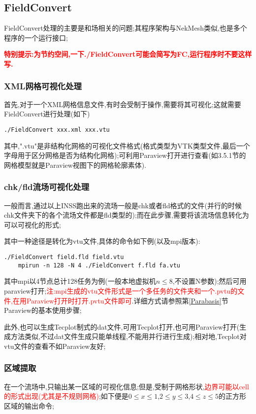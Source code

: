 \subsection{FieldConvert} \label{FieldConvert}
FieldConvert处理的主要是和场相关的问题;其程序架构与NekMesh类似,也是多个程序的一个运行接口;\par
\textcolor{red}{\textbf{特别提示:为节约空间,一下./FieldConvert可能会简写为FC,运行程序时不要这样写.}}

\subsubsection{XML网格可视化处理}
首先,对于一个XML网格信息文件,有时会受制于操作,需要将其可视化;这就需要FieldConvert进行处理(如下)
\begin{lstlisting}[frame=single]
	./FieldConvert xxx.xml xxx.vtu
\end{lstlisting}
\par
其中,".vtu"是非结构化网格的可视化文件格式(格式类型为VTK类型文件,最后一个字母用于区分网格是否为结构化网格);可利用Paraview打开进行查看(如3.5.1节的网格模型就是Paraview视图下的网格轮廓素体).

\subsubsection{chk/fld流场可视化处理}

一般而言,通过以上INSS跑出来的流场一般是chk或者fld格式的文件(并行的时候chk文件夹下的各个流场文件都是fld类型的);而在此步骤,需要将该流场信息转化为可以可视化的形式;\par
其中一种途径是转化为vtu文件,具体的命令如下例(以及mpi版本):
\begin{lstlisting}[frame=single]
	./FieldConvert field.fld field.vtu
	mpirun -n 128 -N 4 ./FieldConvert f.fld fa.vtu
\end{lstlisting}
\par

其中mpi以4节点总计128任务为例(一般本地虚拟机$n \leq 8$,不设置N参数);然后可用paraview打开;\textcolor{red}{注:mpi生成的vtu文件形式是一个多任务的文件夹和一个.pvtu的文件,在用Paraview打开时打开.pvtu文件即可}.详细方式请参照第\ref{Parabasis}节Paraview的基本使用步骤;\par

此外,也可以生成Tecplot制式的dat文件,可用Tecplot打开,也可用Paraview打开(生成方法类似,不过dat文件生成只能单线程,不能用并行进行生成);相对地,Tecplot对vtu文件的查看不如Paraview友好;


\subsubsection{区域提取}
在一个流场中,只输出某一区域的可视化信息;但是,受制于网格形状,\textcolor{red}{边界可能以cell的形式出现(尤其是不规则网格)};如下便是$0\leq x \leq 1$,$2\leq y \leq 3$,$4\leq z \leq 5$的正方形区域的输出命令;

